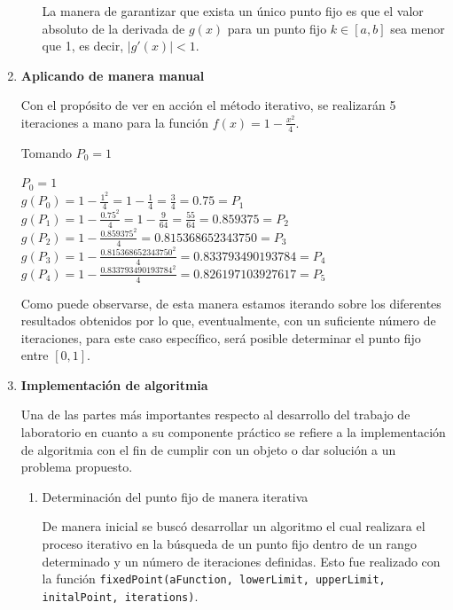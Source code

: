 \documentclass[spanish,notitlepage,letterpaper, 10pt]{article} %
\begin{document}
\begin{enumerate}
\begin{enumerate}
      La manera de garantizar que exista un único punto fijo es que el valor absoluto de la derivada de $g(x)$ para un punto fijo $k \in [a,b]$ sea menor que 1, es decir, $|g'(x)| < 1$.

    \end{enumerate} 
  \item \textbf{Aplicando de manera manual}
  
  Con el propósito de ver en acción el método iterativo, se realizarán 5 iteraciones a mano para la función $f(x)=1-\frac{x^2}{4}$.

  Tomando $P_0 = 1$ 
  \begin{center}
    
    $P_0 = 1$ \\
    $g(P_0) = 1-\frac{1^2}{4} = 1-\frac{1}{4} = \frac{3}{4} = 0.75 = P_1$ \\
    $g(P_1) = 1-\frac{0.75^2}{4} = 1 - \frac{9}{64} = \frac{55}{64} = 0.859375 = P_2 $ \\
    $g(P_2) = 1-\frac{0.859375^2}{4} = 0.815368652343750 = P_3$ \\
    $g(P_3) = 1-\frac{0.815368652343750^2}{4} = 0.833793490193784 = P_4$ \\
    $g(P_4) = 1-\frac{0.833793490193784^2}{4} = 0.826197103927617 = P_5$

  \end{center}

  Como puede observarse, de esta manera estamos iterando sobre los diferentes resultados obtenidos por lo que, eventualmente, con un suficiente número de iteraciones, para este caso específico, será posible determinar el punto fijo entre $[0,1]$.

  \item \textbf{Implementación de algoritmia}

  Una de las partes más importantes respecto al desarrollo del trabajo de laboratorio en cuanto a su componente práctico se refiere a la implementación de algoritmia con el fin de cumplir con un objeto o dar solución a un problema propuesto.

  \begin{enumerate}
    \item Determinación del punto fijo de manera iterativa
    
    De manera inicial se buscó desarrollar un algoritmo el cual realizara el proceso iterativo en la búsqueda de un punto fijo dentro de un rango determinado y un número de iteraciones definidas. Esto fue realizado con la función \texttt{fixedPoint(aFunction, lowerLimit, upperLimit, initalPoint, iterations)}. 


\end{enumerate}
\end{enumerate}
\end{document}

